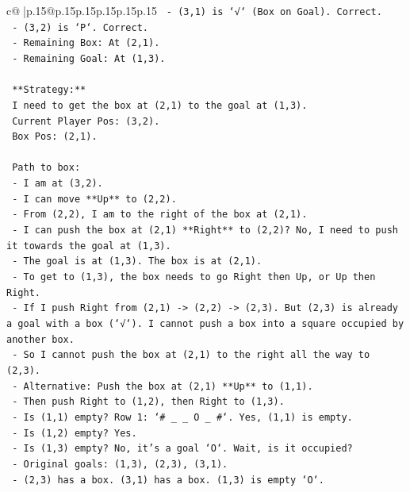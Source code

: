 \documentclass{article}
\begin{document}
{\begin{supertabular}{c@{$\;$}|p{.15\linewidth}@{}p{.15\linewidth}p{.15\linewidth}p{.15\linewidth}p{.15\linewidth}p{.15\linewidth}}
{{{\texttt{      {-} (3,1) is `√` (Box on Goal). Correct.} \\
\texttt{      {-} (3,2) is `P`. Correct.} \\
\texttt{    {-} Remaining Box: At (2,1).} \\
\texttt{    {-} Remaining Goal: At (1,3).} \\
\\ 
\texttt{    **Strategy:**} \\
\texttt{    I need to get the box at (2,1) to the goal at (1,3).} \\
\texttt{    Current Player Pos: (3,2).} \\
\texttt{    Box Pos: (2,1).} \\
\\ 
\texttt{    Path to box:} \\
\texttt{    {-} I am at (3,2).} \\
\texttt{    {-} I can move **Up** to (2,2).} \\
\texttt{    {-} From (2,2), I am to the right of the box at (2,1).} \\
\texttt{    {-} I can push the box at (2,1) **Right** to (2,2)? No, I need to push it towards the goal at (1,3).} \\
\texttt{    {-} The goal is at (1,3). The box is at (2,1).} \\
\texttt{    {-} To get to (1,3), the box needs to go Right then Up, or Up then Right.} \\
\texttt{    {-} If I push Right from (2,1) {-}> (2,2) {-}> (2,3). But (2,3) is already a goal with a box (`√`). I cannot push a box into a square occupied by another box.} \\
\texttt{    {-} So I cannot push the box at (2,1) to the right all the way to (2,3).} \\
\texttt{    {-} Alternative: Push the box at (2,1) **Up** to (1,1).} \\
\texttt{      {-} Then push Right to (1,2), then Right to (1,3).} \\
\texttt{      {-} Is (1,1) empty? Row 1: `\# \_ \_ O \_ \#`. Yes, (1,1) is empty.} \\
\texttt{      {-} Is (1,2) empty? Yes.} \\
\texttt{      {-} Is (1,3) empty? No, it's a goal `O`. Wait, is it occupied?} \\
\texttt{      {-} Original goals: (1,3), (2,3), (3,1).} \\
\texttt{      {-} (2,3) has a box. (3,1) has a box. (1,3) is empty `O`.} \\
}}}
\end{supertabular}}
\end{document}
